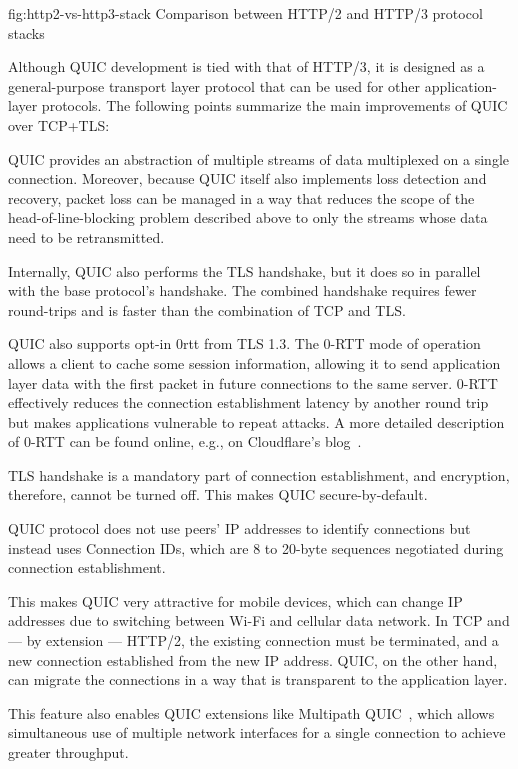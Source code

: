 \begin{myFigure} {fig:http2-vs-http3-stack} {Comparison between HTTP/2 and HTTP/3 protocol stacks}

  

\end{myFigure}

Although QUIC development is tied with that of HTTP/3, it is designed as a general-purpose transport
layer protocol that can be used for other application-layer protocols. The following points
summarize the main improvements of QUIC over TCP+TLS\@:

\begin{itemize}

     QUIC provides an abstraction of multiple streams of data multiplexed
on a single connection. Moreover, because QUIC itself also implements loss detection and recovery,
packet loss can be managed in a way that reduces the scope of the \gls{head-of-line-blocking}
problem described above to only the streams whose data need to be retransmitted.

     Internally, QUIC also performs the TLS handshake, but it
does so in parallel with the base protocol's handshake. The combined handshake requires fewer
round-trips and is faster than the combination of TCP and TLS\@.

    QUIC also supports opt-in \gls{0rtt} from TLS 1.3. The 0-RTT mode of operation allows a client
to cache some session information, allowing it to send application layer data with the first packet
in future connections to the same server. 0-RTT effectively reduces the connection establishment
latency by another round trip but makes applications vulnerable to repeat attacks. A more detailed
description of 0-RTT can be found online, e.g., on Cloudflare's blog~\cite{cloudflare-0rtt}.

     TLS handshake is a mandatory part of connection establishment, and
encryption, therefore, cannot be turned off. This makes QUIC secure-by-default.

     QUIC protocol does not use peers'
IP addresses to identify connections but instead uses Connection IDs, which are 8 to 20-byte
sequences negotiated during connection establishment.

    This makes QUIC very attractive for mobile devices, which can change IP addresses due to
switching between Wi-Fi and cellular data network. In TCP and --- by extension --- HTTP/2, the existing
connection must be terminated, and a new connection established from the new IP address. QUIC, on
the other hand, can migrate the connections in a way that is transparent to the application layer.

    This feature also enables QUIC extensions like Multipath
QUIC~\cite{draft-deconinck-quic-multipath-04}, which allows simultaneous use of multiple network
interfaces for a single connection to achieve greater throughput.

\end{itemize}

